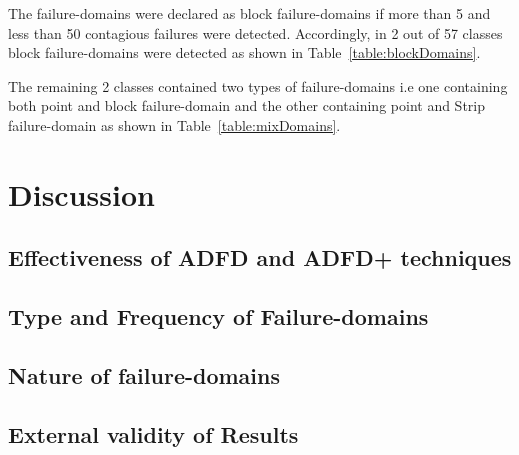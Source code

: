 \documentclass[runningheads,a4paper]{llncs}
\begin{document}
The failure-domains were declared as block failure-domains if more than 5 and less than 50 contagious failures were detected. Accordingly, in 2 out of 57 classes block failure-domains were detected as shown in Table~\ref{table:blockDomains}.

The remaining 2 classes contained two types of failure-domains i.e one containing both point and block failure-domain and the other containing point and Strip failure-domain as shown in Table~\ref{table:mixDomains}.



\section{Discussion}

\subsection{Effectiveness of ADFD and ADFD+ techniques}

\subsection{Type and Frequency of Failure-domains}

\subsection{Nature of failure-domains}

\subsection{External validity of Results}
\end{document}

